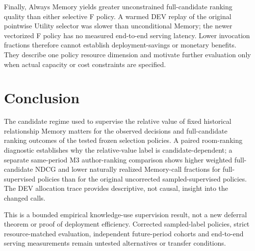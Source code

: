 \documentclass[preprint,12pt]{elsarticle}
\begin{document}
Finally, Always Memory yields greater unconstrained full-candidate ranking quality than either selective F policy. A warmed DEV replay of the original pointwise Utility selector was slower than unconditional Memory; the newer vectorized F policy has no measured end-to-end serving latency. Lower invocation fractions therefore cannot establish deployment-savings or monetary benefits. They describe one policy resource dimension and motivate further evaluation only when actual capacity or cost constraints are specified.

\section{Conclusion}
\label{sec:conclusion}

The candidate regime used to supervise the relative value of fixed historical relationship Memory matters for the observed decisions and full-candidate ranking outcomes of the tested frozen selection policies. A paired room-ranking diagnostic establishes why the relative-value label is candidate-dependent; a separate same-period M3 author-ranking comparison shows higher weighted full-candidate NDCG and lower naturally realized Memory-call fractions for full-supervised policies than for the original uncorrected sampled-supervised policies. The DEV allocation trace provides descriptive, not causal, insight into the changed calls.

This is a bounded empirical knowledge-use supervision result, not a new deferral theorem or proof of deployment efficiency. Corrected sampled-label policies, strict resource-matched evaluation, independent future-period cohorts and end-to-end serving measurements remain untested alternatives or transfer conditions.



\end{document}
